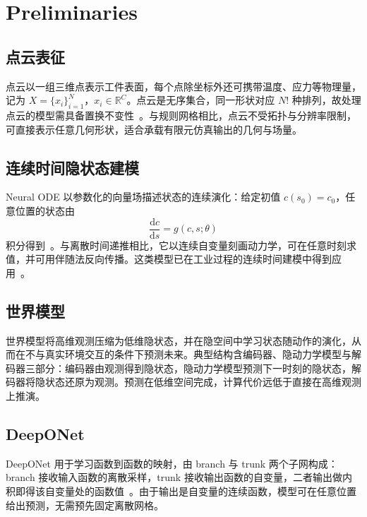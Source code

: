\section{Preliminaries}

\subsection{点云表征}
点云以一组三维点表示工件表面，每个点除坐标外还可携带温度、应力等物理量，记为 $X=\{x_i\}_{i=1}^{N}$，$x_i\in\mathbb{R}^{C}$。点云是无序集合，同一形状对应 $N!$ 种排列，故处理点云的模型需具备置换不变性~\cite{qi2017pointnet}。与规则网格相比，点云不受拓扑与分辨率限制，可直接表示任意几何形状，适合承载有限元仿真输出的几何与场量。

\subsection{连续时间隐状态建模}
Neural ODE 以参数化的向量场描述状态的连续演化：给定初值 $c(s_0)=c_0$，任意位置的状态由
\begin{equation}
\frac{\mathrm{d}c}{\mathrm{d}s}=g(c,s;\theta)
\end{equation}
积分得到~\cite{chen2018neural}。与离散时间递推相比，它以连续自变量刻画动力学，可在任意时刻求值，并可用伴随法反向传播。这类模型已在工业过程的连续时间建模中得到应用~\cite{yuan2022autonomous, yuan2023ode, yuan2022differential}。

\subsection{世界模型}
世界模型将高维观测压缩为低维隐状态，并在隐空间中学习状态随动作的演化，从而在不与真实环境交互的条件下预测未来。典型结构含编码器、隐动力学模型与解码器三部分：编码器由观测得到隐状态，隐动力学模型预测下一时刻的隐状态，解码器将隐状态还原为观测。预测在低维空间完成，计算代价远低于直接在高维观测上推演。

\subsection{DeepONet}
DeepONet 用于学习函数到函数的映射，由 branch 与 trunk 两个子网构成：branch 接收输入函数的离散采样，trunk 接收输出函数的自变量，二者输出做内积即得该自变量处的函数值~\cite{lu2021deeponet}。由于输出是自变量的连续函数，模型可在任意位置给出预测，无需预先固定离散网格。
